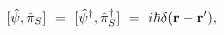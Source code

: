 \begin{equation}
\lbrack \hat{\psi},\hat{\pi}_{S}]\ =\ [\hat{\psi}^{\dagger },\hat{\pi}%
_{S}^{\dagger }]\ =\ i\hbar \delta ({\bf r}-{\bf r^{\prime }}),
\label{cancomm}
\end{equation}%
